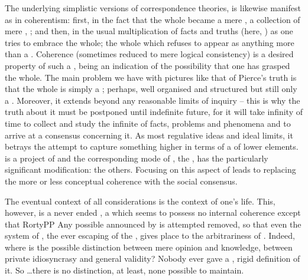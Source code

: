  The  underlying
simplistic versions of correspondence theories, is likewise manifest as
 in coherentism: first, in the fact that the whole
became a mere , a collection of mere , ; and
then, in the usual multiplication of facts and truths (here, ) as one
tries to embrace the whole; the whole which refuses to appear as anything more
than a .  Coherence (sometimes reduced to mere logical consistency)
is a desired property of such a , being an indication of the
possibility that one has  grasped the whole.
The main problem we have with pictures like that of Pierce's truth is that the
whole is simply a ; perhaps, well organised and structured but
still only a . Moreover, it extends beyond any reasonable limits of
inquiry -- this is why the truth about it must be postponed until indefinite
future, for it will take infinity of time to collect and study the infinite
 of facts, problems and phenomena and to arrive at a consensus
concerning it. As most regulative ideas and ideal limits, it betrays the attempt
to capture something higher in terms of a  of lower elements.
 is a project of  and the corresponding mode of
, the , has the particularly
significant modification: the others. Focusing on this aspect of
 leads to replacing the more or less conceptual coherence with
the social consensus.

The eventual context of all considerations is the context of one's life. This,
however, is a never ended , a  which seems to possess
no internal coherence except that \citet{which it happened to obtain at the last
  turn of hermeneutical circle.}{RortyPP}{} Any possible
 announced by  is attempted removed, so that even
the system of , the ever escaping  of the
, gives place to the arbitrariness of .
Indeed, where is the possible distinction between mere opinion and knowledge,
between private idiosyncrasy and general validity?  Nobody ever gave a
, rigid definition of it.  So \ldots there is no distinction, at
least, none possible to maintain.

